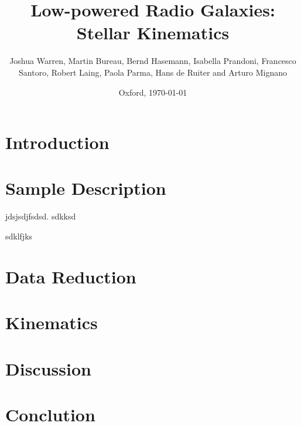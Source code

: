 \documentclass[a4paper,11pt]{article}
\numberwithin{equation}{section}
\begin{document}
\title{Low-powered Radio Galaxies: Stellar Kinematics}
\author{Joshua Warren, Martin Bureau, Bernd Hasemann, Isabella Prandoni, Francesco Santoro, Robert Laing, Paola Parma, Hans de Ruiter and Arturo Mignano}
\date{Oxford, \today}

\begin{abstract}

\end{abstract}

\maketitle


\section{Introduction}
	\label{sec:intro}

\section{Sample Description}
	\label{sec:samp}
	jdsjsdjfsdsd.
	sdkksd

	sdklfjks

\section{Data Reduction}
	\label{sec:reduct}

\section{Kinematics}
	\label{sec:kine}

\section{Discussion}
	\label{sec:discuss}

\section{Conclution}
	\label{sec:conc}






\end{document}
